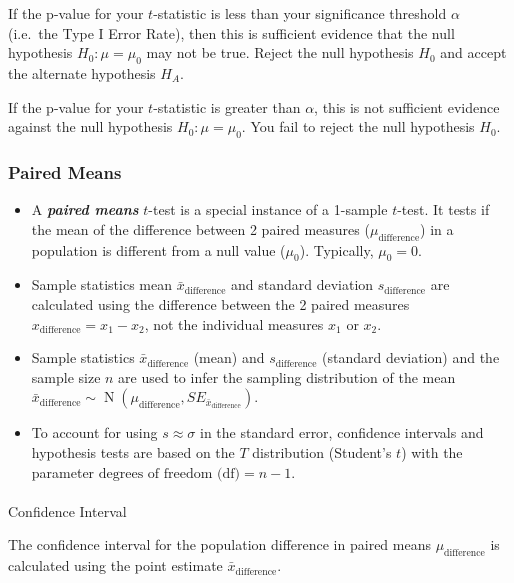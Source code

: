 \documentclass[
  letterpaper,
  DIV=11,
  numbers=noendperiod]{scrartcl}
\makeatletter
\let\oldparagraph\paragraph
\renewcommand{\paragraph}{
    \@ifstar
      \xxxParagraphStar
      \xxxParagraphNoStar
  }
\newcommand{\xxxParagraphStar}[1]{\oldparagraph*{#1}\mbox{}}
\newcommand{\xxxParagraphNoStar}[1]{\oldparagraph{#1}\mbox{}}
\makeatother
\begin{document}
If the p-value for your \(t\)-statistic is less than your significance
threshold \(\alpha\) (i.e.~the Type I Error Rate), then this is
sufficient evidence that the null hypothesis \(H_0 \colon \mu=\mu_0\)
may not be true. Reject the null hypothesis \(H_0\) and accept the
alternate hypothesis \(H_A\).

If the p-value for your \(t\)-statistic is greater than \(\alpha\), this
is not sufficient evidence against the null hypothesis
\(H_0 \colon \mu=\mu_0\). You fail to reject the null hypothesis
\(H_0\).

\subsubsection{Paired Means}\label{paired-means}

\begin{itemize}
\item
  A \textbf{\emph{paired means}} \(t\)-test is a special instance of a
  1-sample \(t\)-test. It tests if the mean of the difference between 2
  paired measures (\(\mu_{\text{difference}}\)) in a population is
  different from a null value (\(\mu_0\)). Typically, \(\mu_0=0\).
\item
  Sample statistics mean \(\bar{x}_{\text{difference}}\) and standard
  deviation \(s_{\text{difference}}\) are calculated using the
  difference between the 2 paired measures
  \(x_{\text{difference}}=x_1-x_2\), not the individual measures \(x_1\)
  or \(x_2\).
\item
  Sample statistics \(\bar{x}_{\text{difference}}\) (mean) and
  \(s_{\text{difference}}\) (standard deviation) and the sample size
  \(n\) are used to infer the sampling distribution of the mean
  \(\bar{x}_{\text{difference}} \sim \operatorname{N}\left(\mu_{\text{difference}}, SE_{\bar{x}_{\text{difference}}}\right)\).
\item
  To account for using \(s \approx \sigma\) in the standard error,
  confidence intervals and hypothesis tests are based on the \(T\)
  distribution (Student's \(t\)) with the parameter
  \(\text{degrees of freedom (df)}=n-1\).
\end{itemize}

\paragraph{Confidence Interval}\label{confidence-interval-1}

The confidence interval for the population difference in paired means
\(\mu_{\text{difference}}\) is calculated using the point estimate
\(\bar{x}_{\text{difference}}\).
\end{document}
